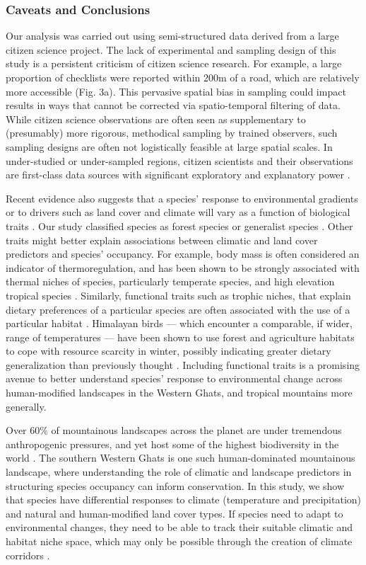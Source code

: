 \subsubsection*{Caveats and Conclusions}

Our analysis was carried out using semi-structured data derived from a large citizen science project.
The lack of experimental and sampling design of this study is a persistent criticism of citizen science research.
For example, a large proportion of checklists were reported within 200m of a road, which are relatively more accessible (Fig. 3a).
This pervasive spatial bias in sampling could impact results in ways that cannot be corrected via spatio-temporal filtering of data.
While citizen science observations are often seen as supplementary to (presumably) more rigorous, methodical sampling by trained observers, such sampling designs are often not logistically feasible at large spatial scales.
In under-studied or under-sampled regions, citizen scientists and their observations are first-class data sources with significant exploratory and explanatory power \citep{devictor2010,ellwood2017,robinson2020b}.

Recent evidence also suggests that a species' response to environmental gradients or to drivers such as land cover and climate will vary as a function of biological traits \citep{mcgill2006}.
Our study classified species as forest species or generalist species \citep{ali1983a}.
Other traits might better explain associations between climatic and land cover predictors and species' occupancy.
For example, body mass is often considered an indicator of thermoregulation, and has been shown to be strongly associated with thermal niches of species, particularly temperate species, and high elevation tropical species \citep{barve2021}.
Similarly, functional traits such as trophic niches, that explain dietary preferences of a particular species are often associated with the use of a particular habitat \citep{pigot2020}.
Himalayan birds --- which encounter a comparable, if wider, range of temperatures --- have been shown to use forest and agriculture habitats to cope with resource scarcity in winter, possibly indicating greater dietary generalization than previously thought \citep{elsen2018}.
Including functional traits is a promising avenue to better understand species' response to environmental change across human-modified landscapes in the Western Ghats, and tropical mountains more generally.

Over 60\% of mountainous landscapes across the planet are under tremendous anthropogenic pressures, and yet host some of the highest biodiversity in the world \citep{lasorte2010,elsen2020}.
The southern Western Ghats is one such human-dominated mountainous landscape, where understanding the role of climatic and landscape predictors in structuring species occupancy can inform conservation.
In this study, we show that species have differential responses to climate (temperature and precipitation) and natural and human-modified land cover types.
If species need to adapt to environmental changes, they need to be able to track their suitable climatic and habitat niche space, which may only be possible through the creation of climate corridors \citep{freeman2018}.

